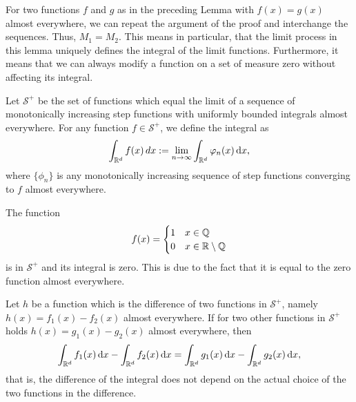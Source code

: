 \begin{note}
  For two functions $f$ and $g$ as in the preceding Lemma with $f(x) =
  g(x)$ almost everywhere, we can repeat the argument of the proof and
  interchange the sequences. Thus, $M_1 = M_2$.
  This means in particular, that the limit process in this lemma
  uniquely defines the integral of the limit functions. Furthermore,
  it means that we can always modify a function on a set of measure
  zero without affecting its integral.
\end{note}

\begin{definition}
  \label{definition:integral:Splus}
  Let $\mathcal S^+$ be the set of functions which equal the limit of
  a sequence of monotonically increasing step functions with uniformly
  bounded
  integrals almost everywhere. For any function $f\in \mathcal S^+$, we
  define the integral as
  \begin{gather*}
    \int_{\mathbb R^d} f(x) \,dx := \lim_{n\to\infty} \int_{\mathbb R^d}\varphi_n(x)\,\mathrm{d} x,
  \end{gather*}
  where $\{\phi_n\}$ is any monotonically increasing sequence of step
  functions converging to $f$ almost everywhere.
\end{definition}

\begin{example}
  The function
  \begin{gather*}
    f(x) =
    \begin{cases}
      1 & x\in \mathbb Q \\
      0 & x\in \mathbb R\setminus \mathbb Q
    \end{cases}
  \end{gather*}
  is in $\mathcal S^+$ and its integral is zero. This is due to the fact that
  it is equal to the zero function almost everywhere.
\end{example}

\begin{lemma}
  Let $h$ be a function which is the difference of two functions in
  $\mathcal S^+$, namely $h(x) = f_1(x)-f_2(x)$ almost everywhere. If
  for two other functions in $\mathcal S^+$ holds $h(x) =
  g_1(x)-g_2(x)$ almost everywhere, then
  \begin{gather}
    \label{eq:integral:2}
    \int_{\mathbb R^d} f_1(x)\,\mathrm{d} x
    -\int_{\mathbb R^d} f_2(x)\,\mathrm{d} x
    =\int_{\mathbb R^d} g_1(x)\,\mathrm{d} x
    -\int_{\mathbb R^d} g_2(x)\,\mathrm{d} x,
  \end{gather}
  that is, the difference of the integral does not depend on the
  actual choice of the two functions in the difference.
\end{lemma}

